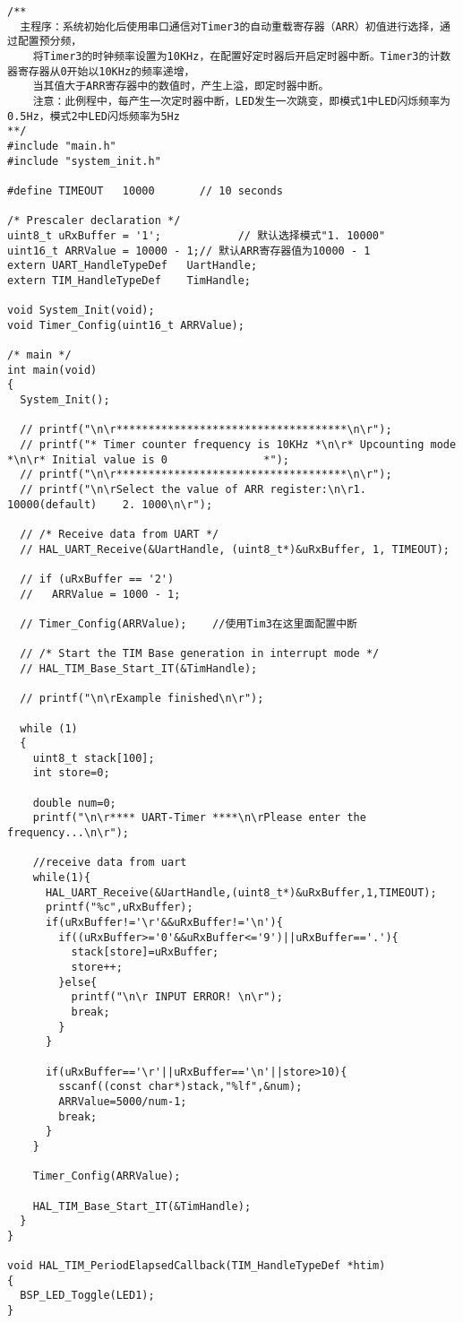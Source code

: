 ﻿\documentclass[UTF8,12pt]{article}
\begin{document}
\begin{lstlisting}[frame=shadowbox]
/**
  主程序：系统初始化后使用串口通信对Timer3的自动重载寄存器（ARR）初值进行选择，通过配置预分频，
	将Timer3的时钟频率设置为10KHz，在配置好定时器后开启定时器中断。Timer3的计数器寄存器从0开始以10KHz的频率递增，
	当其值大于ARR寄存器中的数值时，产生上溢，即定时器中断。
	注意：此例程中，每产生一次定时器中断，LED发生一次跳变，即模式1中LED闪烁频率为0.5Hz，模式2中LED闪烁频率为5Hz
**/
#include "main.h"
#include "system_init.h"

#define TIMEOUT   10000       // 10 seconds

/* Prescaler declaration */
uint8_t uRxBuffer = '1';			// 默认选择模式"1. 10000"
uint16_t ARRValue = 10000 - 1;// 默认ARR寄存器值为10000 - 1
extern UART_HandleTypeDef   UartHandle;
extern TIM_HandleTypeDef    TimHandle;

void System_Init(void);
void Timer_Config(uint16_t ARRValue);
    
/* main */
int main(void)
{
  System_Init();
  
  // printf("\n\r************************************\n\r");
  // printf("* Timer counter frequency is 10KHz *\n\r* Upcounting mode                  *\n\r* Initial value is 0               *");
  // printf("\n\r************************************\n\r");
  // printf("\n\rSelect the value of ARR register:\n\r1. 10000(default)    2. 1000\n\r");
  
  // /* Receive data from UART */
  // HAL_UART_Receive(&UartHandle, (uint8_t*)&uRxBuffer, 1, TIMEOUT);
  
  // if (uRxBuffer == '2')
  //   ARRValue = 1000 - 1;

  // Timer_Config(ARRValue);	//使用Tim3在这里面配置中断

  // /* Start the TIM Base generation in interrupt mode */
  // HAL_TIM_Base_Start_IT(&TimHandle);
  
  // printf("\n\rExample finished\n\r");
  
  while (1)
  {
    uint8_t stack[100];
    int store=0;

    double num=0;
    printf("\n\r**** UART-Timer ****\n\rPlease enter the frequency...\n\r");

    //receive data from uart
    while(1){
      HAL_UART_Receive(&UartHandle,(uint8_t*)&uRxBuffer,1,TIMEOUT);
      printf("%c",uRxBuffer);
      if(uRxBuffer!='\r'&&uRxBuffer!='\n'){
        if((uRxBuffer>='0'&&uRxBuffer<='9')||uRxBuffer=='.'){
          stack[store]=uRxBuffer;
          store++;
        }else{
          printf("\n\r INPUT ERROR! \n\r");
          break;
        }
      }

      if(uRxBuffer=='\r'||uRxBuffer=='\n'||store>10){
        sscanf((const char*)stack,"%lf",&num);
        ARRValue=5000/num-1;
        break;
      }
    }

    Timer_Config(ARRValue);

    HAL_TIM_Base_Start_IT(&TimHandle);
  }
}

void HAL_TIM_PeriodElapsedCallback(TIM_HandleTypeDef *htim)
{
  BSP_LED_Toggle(LED1);
}
\end{lstlisting}
\end{document}
